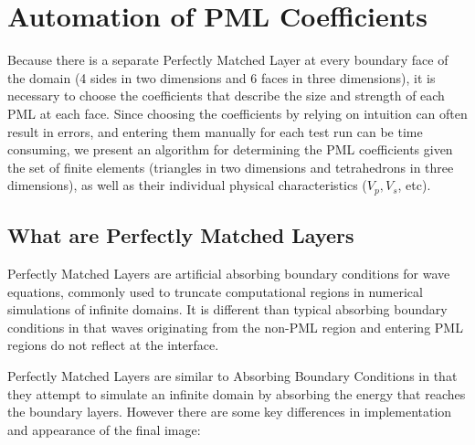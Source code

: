 \newpage
\section{Automation of PML Coefficients}

Because there is a separate Perfectly Matched Layer at every boundary face of the domain (4 sides in two dimensions and 6 faces in three dimensions), it is necessary to choose the coefficients that describe the size and strength of each PML at each face. Since choosing the coefficients by relying on intuition can often result in errors, and entering them manually for each test run can be time consuming, we present an algorithm for determining the PML coefficients given the set of finite elements (triangles in two dimensions and tetrahedrons in three dimensions), as well as their individual physical characteristics ($V_p, V_s$, etc).

\subsection{What are Perfectly Matched Layers}

Perfectly Matched Layers are artificial absorbing boundary conditions for wave equations, commonly used to truncate computational regions in numerical simulations of infinite domains. It is different than typical absorbing boundary conditions in that waves originating from the non-PML region and entering PML regions do not reflect at the interface.

Perfectly Matched Layers are similar to Absorbing Boundary Conditions in that they attempt to simulate an infinite domain by absorbing the energy that reaches the boundary layers. However there are some key differences in implementation and appearance of the final image:

